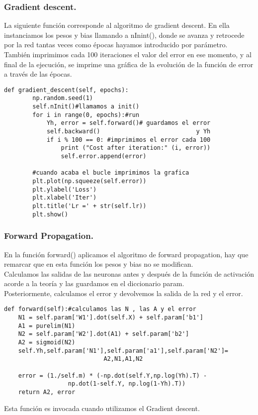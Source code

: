 \documentclass[a4paper,11pt]{article}
\begin{document}
\subsubsection{Gradient descent.}

La siguiente función corresponde al algoritmo de gradient descent. En ella instanciamos los pesos y bias llamando a nInint(), donde se avanza y retrocede por la red tantas veces como épocas hayamos introducido por parámetro. \\

\noindent
También imprimimos cada 100 iteraciones el valor del error en ese momento, y al final de la ejecución, se imprime una gráfica de la evolución de la función de error a través de las épocas.
\begin{lstlisting}
def gradient_descent(self, epochs):
        np.random.seed(1)                         
        self.nInit()#llamamos a init()
        for i in range(0, epochs):#run
            Yh, error = self.forward()# guardamos el error 
            self.backward()                           y Yh
            if i % 100 == 0: #imprimimos el error cada 100 
                print ("Cost after iteration:" (i, error)) 
                self.error.append(error) 

        #cuando acaba el bucle imprimimos la grafica	
        plt.plot(np.squeeze(self.error))
        plt.ylabel('Loss')
        plt.xlabel('Iter')
        plt.title('Lr =' + str(self.lr))
        plt.show()        

\end{lstlisting}

\subsubsection{Forward Propagation.}

En la función forward() aplicamos el algoritmo de forward propagation, hay que remarcar que en esta función los pesos y bias no se modifican.\\ 

\noindent
Calculamos las salidas de las neuronas antes y después de la función de activación acorde a la teoría y las guardamos en el diccionario param.\\

\noindent
Posteriormente, calculamos el error y devolvemos la salida de la red y el error.
\begin{lstlisting}
def forward(self):#calculamos las N , las A y el error
    N1 = self.param['W1'].dot(self.X) + self.param['b1']
    A1 = purelim(N1)
    N2 = self.param['W2'].dot(A1) + self.param['b2']
    A2 = sigmoid(N2)
    self.Yh,self.param['N1'],self.param['a1'],self.param['N2']=
						    A2,N1,A1,N2

    error = (1./self.m) * (-np.dot(self.Y,np.log(Yh).T) - 
			      np.dot(1-self.Y, np.log(1-Yh).T))
    return A2, error
\end{lstlisting}
Esta función es invocada cuando utilizamos el Gradient descent.
\end{document}
